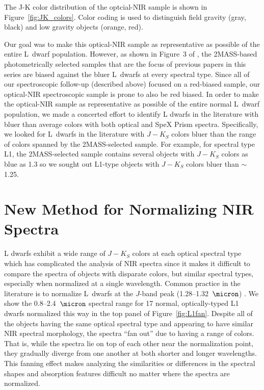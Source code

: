 \documentclass[12pt,preprint]{aastex}
\begin{document}
The J-K color distribution of the optcial-NIR sample is shown in Figure~\ref{fig:JK_colors}. Color coding is used to distinguish field gravity (gray, black) and low gravity objects (orange, red). 

Our goal was to make this optical-NIR sample as representative as possible of the entire L~dwarf population. 
However, as shown in Figure~3 of \cite{Schmidt10}, the 2MASS-based photometrically selected samples that are the focus of previous papers in this series \citep{Cruz03, Reid08} are biased against the bluer L~dwarfs at every spectral type. 
Since all of our spectroscopic follow-up (described above) focused on a red-biased sample, our optical-NIR spectroscopic sample is prone to also be red biased. 
In order to make the optical-NIR sample as representative as possible of the entire normal L~dwarf population, we made a concerted effort to identify L dwarfs in the literature with bluer than average colors with both optical and SpeX Prism spectra.
Specifically, we looked for L~dwarfs in the literature with $J-K_S$ colors bluer than the range of colors spanned by the 2MASS-selected sample. 
For example, for spectral type L1, the 2MASS-selected sample contains several objects with $J-K_S$ colors as blue as 1.3 so we sought out L1-type objects with $J-K_S$ colors bluer than $\sim$1.25.

\section{New Method for Normalizing NIR Spectra}
\label{sec:method}

L dwarfs exhibit a wide range of $J-K_S$ colors at each optical spectral type \cite[e.g.,][Fig. 3]{Schmidt10} which has complicated the analysis of NIR spectra since it makes it difficult to  compare the spectra of objects with disparate colors, but similar spectral types, especially when normalized at a single wavelength.
Common practice in the literature is to normalize L~dwarfs at the $J$-band peak (1.28--1.32~$\micron$) \citep[e.g.,][]{Kirkpatrick10}. 
We show the 0.8--2.4~$\micron$ spectral range for 17 normal, optically-typed L1 dwarfs normalized this way in the top panel of Figure~\ref{fig:L1fan}.
Despite all of the objects having the same optical spectral type and appearing to have similar NIR spectral morphology, the spectra ``fan out'' due to having a range of colors. That is, while the spectra lie on top of each other near the normalization point, they gradually diverge from one another at both shorter and longer wavelengths.
This fanning effect makes analyzing the similarities or differences in the spectral shapes and absorption features difficult no matter where the spectra are normalized.
\end{document}
